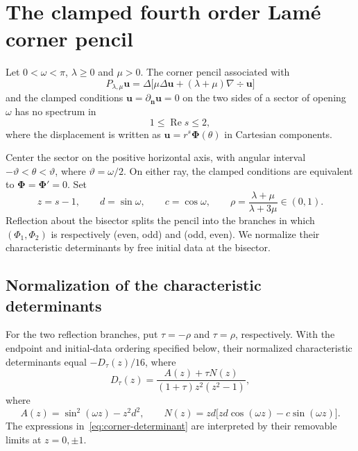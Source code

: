 \appendix
\section{The clamped fourth order Lam\'e corner pencil}\label{app:corner-spectrum}

\begin{theorem}\label{thm:corner-spectrum}
Let $0<\omega<\pi$, $\lambda\geq0$ and $\mu>0$. The corner pencil associated with
\[
P_{\lambda,\mu}\boldsymbol u
=\Delta\big[\mu\Delta\boldsymbol u+(\lambda+\mu)\nabla\div\boldsymbol u\big]
\]
and the clamped conditions $\boldsymbol u=\partial_{\boldsymbol n}\boldsymbol u=0$ on the two sides of a sector of opening $\omega$ has no spectrum in
\[
1\leq\operatorname{Re}s\leq2,
\]
where the displacement is written as $\boldsymbol u=r^s\boldsymbol\Phi(\theta)$ in Cartesian components.
\end{theorem}

Center the sector on the positive horizontal axis, with angular interval $-\vartheta<\theta<\vartheta$, where $\vartheta=\omega/2$. On either ray, the clamped conditions are equivalent to $\boldsymbol\Phi=\boldsymbol\Phi'=0$. Set
\[
z=s-1,\qquad d=\sin\omega,\qquad c=\cos\omega,
\qquad \rho=\frac{\lambda+\mu}{\lambda+3\mu}\in(0,1).
\]
Reflection about the bisector splits the pencil into the branches in which $(\Phi_1,\Phi_2)$ is respectively (even, odd) and (odd, even). We normalize their characteristic determinants by free initial data at the bisector.

\subsection{Normalization of the characteristic determinants}

\begin{lemma}\label{lem:corner-determinant}
For the two reflection branches, put $\tau=-\rho$ and $\tau=\rho$, respectively. With the endpoint and initial-data ordering specified below, their normalized characteristic determinants equal $-D_\tau(z)/16$, where
\begin{equation}\label{eq:corner-determinant}
D_\tau(z)=\frac{A(z)+\tau N(z)}{(1+\tau)z^2(z^2-1)},
\end{equation}
where
\begin{equation}\label{eq:corner-AN}
A(z)=\sin^2(\omega z)-z^2d^2,
\qquad N(z)=zd\big[zd\cos(\omega z)-c\sin(\omega z)\big].
\end{equation}
The expressions in~\eqref{eq:corner-determinant} are interpreted by their removable limits at $z=0,\pm1$.
\end{lemma}

